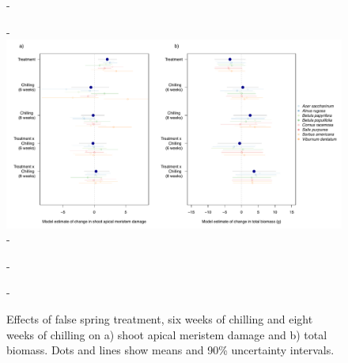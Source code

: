 \documentclass{article}\usepackage[]{graphicx}\usepackage[]{color}
\begin{document}
  {\begin{figure} [H]
  -\begin{center}
  -\includegraphics[width=18cm]{..//analyses/figures/mu_growth90.pdf} 
  -\caption{Effects of false spring treatment, six weeks of chilling and eight weeks of chilling on a) shoot apical meristem damage and b) total biomass. Dots and lines show means and 90\% uncertainty intervals. }\label{fig:mugrowth}
  -\end{center}
  -\end{figure}}
  
  
\end{document}
